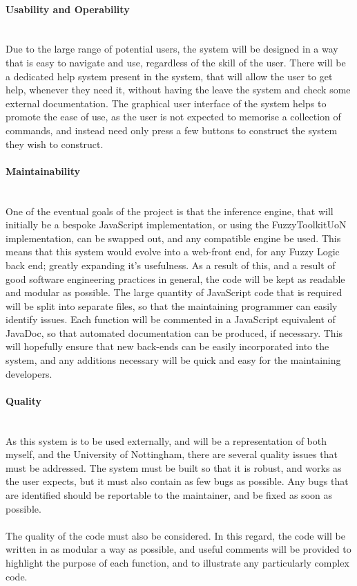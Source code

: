 \paragraph{Usability and Operability}\ \\
Due to the large range of potential users, the system will be designed in a way that is easy to navigate and use, regardless of the skill of the user. There will be a dedicated help system present in the system, that will allow the user to get help, whenever they need it, without having the leave the system and check some external documentation. The graphical user interface of the system helps to promote the ease of use, as the user is not expected to memorise a collection of commands, and instead need only press a few buttons to construct the system they wish to construct.

\paragraph{Maintainability}\ \\
One of the eventual goals of the project is that the inference engine, that will initially be a bespoke JavaScript implementation, or using the FuzzyToolkitUoN implementation, can be swapped out, and any compatible engine be used. This means that this system would evolve into a web-front end, for any Fuzzy Logic back end; greatly expanding it's usefulness. As a result of this, and a result of good software engineering practices in general, the code will be kept as readable and modular as possible. The large quantity of JavaScript code that is required will be split into separate files, so that the maintaining programmer can easily identify issues. Each function will be commented in a JavaScript equivalent of JavaDoc, so that automated documentation can be produced, if necessary. This will hopefully ensure that new back-ends can be easily incorporated into the system, and any additions necessary will be quick and easy for the maintaining developers.

\paragraph{Quality}\ \\
As this system is to be used externally, and will be a representation of both myself, and the University of Nottingham, there are several quality issues that must be addressed. The system must be built so that it is robust, and works as the user expects, but it must also contain as few bugs as possible. Any bugs that are identified should be reportable to the maintainer, and be fixed as soon as possible.\ \\
\ \\
The quality of the code must also be considered. In this regard, the code will be written in as modular a way as possible, and useful comments will be provided to highlight the purpose of each function, and to illustrate any particularly complex code.

